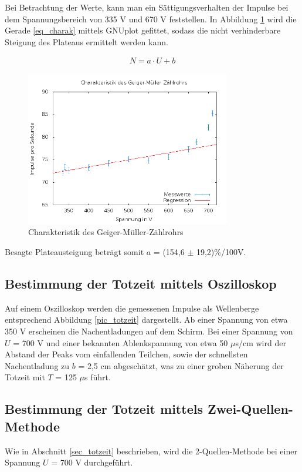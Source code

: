 Bei Betrachtung der Werte, kann man ein Sättigungsverhalten der Impulse bei dem Spannungsbereich von 335 V und 670 V feststellen. In
Abbildung \ref{pic_plateau} wird die Gerade \eqref{eq_charak} mittels GNUplot gefittet, sodass die nicht verhinderbare Steigung des Plateaus ermittelt
werden kann.

\begin{align}
 N = a\cdot U + b
 \label{eq_charak}
\end{align}


\begin{figure}[H]
 \includegraphics[width=0.8\textwidth]{pics/charakteristik.png}
 \caption{Charakteristik des Geiger-Müller-Zählrohrs}
 \label{pic_plateau}
\end{figure}
Besagte Plateausteigung beträgt somit $a$ = (154,6 $\pm$ 19,2)\%/100V.

\subsection{Bestimmung der Totzeit mittels Oszilloskop}
Auf einem Oszilloskop werden die gemessenen Impulse als Wellenberge entsprechend Abbildung \ref{pic_totzeit} dargestellt. Ab einer
Spannung von etwa 350 V erscheinen die Nachentladungen auf dem Schirm. Bei einer Spannung von $U$ = 700 V und einer bekannten
Ablenkspannung von etwa 50 $\mu$s/cm wird der Abstand der Peaks vom einfallenden Teilchen, sowie der schnellsten Nachentladung zu
$b$ = 2,5 cm abgeschätzt, was zu einer groben Näherung der Totzeit mit $T$ = 125 $\mu$s führt.

\subsection{Bestimmung der Totzeit mittels Zwei-Quellen-Methode}
Wie in Abschnitt \ref{sec_totzeit} beschrieben, wird die 2-Quellen-Methode bei einer Spannung $U$ = 700 V durchgeführt.

